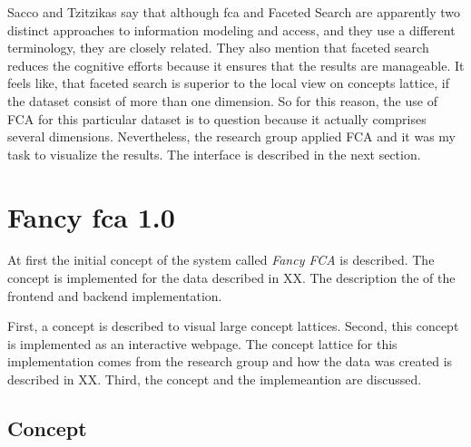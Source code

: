 \documentclass[11pt]{report}
\begin{document}
Sacco and Tzitzikas \cite{Sacco2009} say that although \acrshort{fca} and Faceted Search are apparently two distinct approaches to information modeling and access, and they use a different terminology, they are closely related. They also mention that faceted search reduces the cognitive efforts because it ensures that the results are manageable. It feels like, that faceted search is superior to the local view on concepts lattice, if the dataset consist of more than one dimension. So for this reason, the use of FCA for this particular dataset is to question because it actually comprises several dimensions. Nevertheless, the research group applied FCA and it was my task to visualize the results. The interface is described in the next section.

\chapter{Fancy \acrshort{fca} 1.0}
\label{Fancy 1.0}

At first the initial concept of the system called \textit{Fancy FCA} is described. The concept is implemented for the data described in XX. The description the of the frontend and backend implementation.

First, a concept is described to visual large concept lattices. Second, this concept is implemented as an interactive webpage. The concept lattice for this implementation comes from the research group and how the data was created is described in XX. Third, the concept and the implemeantion are discussed.

\section{Concept}
\end{document}
